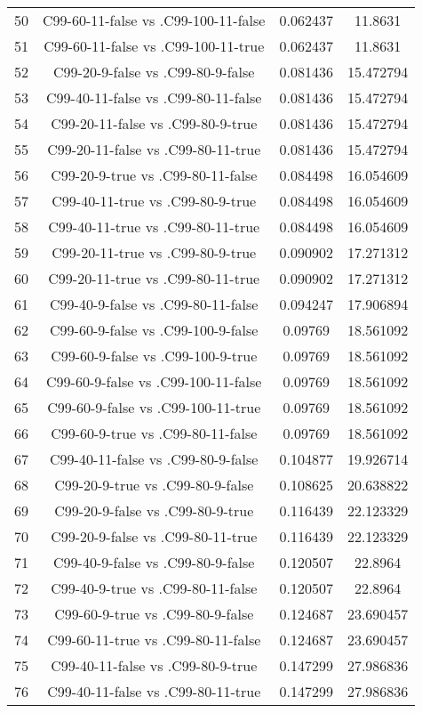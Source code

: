 \documentclass[a4paper,10pt]{article}
\begin{document}
\begin{landscape}
\begin{table}[!htp]
\begin{tabular}{cccc}
50&C99-60-11-false vs .C99-100-11-false&0.062437&11.8631\\
51&C99-60-11-false vs .C99-100-11-true&0.062437&11.8631\\
52&C99-20-9-false vs .C99-80-9-false&0.081436&15.472794\\
53&C99-40-11-false vs .C99-80-11-false&0.081436&15.472794\\
54&C99-20-11-false vs .C99-80-9-true&0.081436&15.472794\\
55&C99-20-11-false vs .C99-80-11-true&0.081436&15.472794\\
56&C99-20-9-true vs .C99-80-11-false&0.084498&16.054609\\
57&C99-40-11-true vs .C99-80-9-true&0.084498&16.054609\\
58&C99-40-11-true vs .C99-80-11-true&0.084498&16.054609\\
59&C99-20-11-true vs .C99-80-9-true&0.090902&17.271312\\
60&C99-20-11-true vs .C99-80-11-true&0.090902&17.271312\\
61&C99-40-9-false vs .C99-80-11-false&0.094247&17.906894\\
62&C99-60-9-false vs .C99-100-9-false&0.09769&18.561092\\
63&C99-60-9-false vs .C99-100-9-true&0.09769&18.561092\\
64&C99-60-9-false vs .C99-100-11-false&0.09769&18.561092\\
65&C99-60-9-false vs .C99-100-11-true&0.09769&18.561092\\
66&C99-60-9-true vs .C99-80-11-false&0.09769&18.561092\\
67&C99-40-11-false vs .C99-80-9-false&0.104877&19.926714\\
68&C99-20-9-true vs .C99-80-9-false&0.108625&20.638822\\
69&C99-20-9-false vs .C99-80-9-true&0.116439&22.123329\\
70&C99-20-9-false vs .C99-80-11-true&0.116439&22.123329\\
71&C99-40-9-false vs .C99-80-9-false&0.120507&22.8964\\
72&C99-40-9-true vs .C99-80-11-false&0.120507&22.8964\\
73&C99-60-9-true vs .C99-80-9-false&0.124687&23.690457\\
74&C99-60-11-true vs .C99-80-11-false&0.124687&23.690457\\
75&C99-40-11-false vs .C99-80-9-true&0.147299&27.986836\\
76&C99-40-11-false vs .C99-80-11-true&0.147299&27.986836\\

\end{tabular}
\end{table}
\end{landscape}
\end{document}
